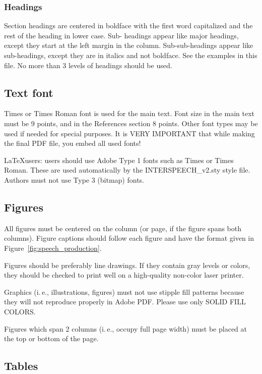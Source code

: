 \subsubsection{Headings}

Section headings are centered in boldface with the first word capitalized and the rest of the heading in lower case. Sub- headings appear like major headings, except they start at the left margin in the column. Sub-sub-headings appear like sub-headings, except they are in italics and not boldface. See the examples in this file. No more than 3 levels of headings should be used.

\subsection{Text font}

Times or Times Roman font is used for the main text. Font size in the main text must be 9 points, and in the References section 8 points. Other font types may be used if needed for special purposes. It is VERY IMPORTANT that while making the final PDF file, you embed all used fonts!

\LaTeX users: users should use Adobe Type 1 fonts such as Times or Times Roman. These are used automatically by the INTERSPEECH\_v2.sty style file. Authors must not use Type 3 (bitmap) fonts.

\subsection{Figures}

All figures must be centered on the column (or page, if the figure spans both columns). Figure captions should follow each figure and have the format given in Figure~\ref{fig:speech_production}.

Figures should be preferably line drawings. If they contain gray levels or colors, they should be checked to print well on a high-quality non-color laser printer.

Graphics (i.\,e., illustrations, figures) must not use stipple fill patterns because they will not reproduce properly in Adobe PDF. Please use only SOLID FILL COLORS.

Figures which span 2 columns (i.\,e., occupy full page width) must be placed at the top or bottom of the page.

\subsection{Tables}

